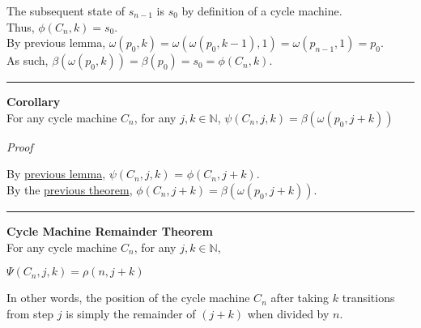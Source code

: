 \documentclass[a4paper,12pt]{article}
\begin{document}
\noindent The subsequent state of $s_{n-1}$ is $s_0$ by definition of a cycle machine.\\

\noindent Thus, $\phi(C_n, k) = s_0$.\\

\noindent By previous lemma, $\omega(p_0, k) = \omega(\omega(p_0, k - 1), 1) = \omega(p_{n-1}, 1) = p_0$.\\

\noindent As such, $\beta(\omega(p_0, k)) = \beta(p_0) = s_0 = \phi(C_n, k)$.\\


\noindent 
\begin{center}
\noindent\rule{8cm}{0.4pt}
\end{center}










\label{corollary:bridged_state_function}
\hypertarget{corollary:bridged_state_function}{}
\begin{tcolorbox}
\textbf{Corollary}\\
For any cycle machine $C_n$, for any $j, k \in \mathbb{N}$, $\psi(C_n, j, k) = \beta(\omega(p_0, j + k))$
\end{tcolorbox}

\noindent
\textit{Proof}

\noindent By \hyperlink{lemma:psi_well_defined}{previous lemma}, $\psi(C_n, j, k)$ = $\phi(C_n, j + k)$.\\

\noindent By the \hyperlink{theorem:bridge_theorem}{previous theorem}, $\phi(C_n, j + k) = \beta(\omega(p_0, j + k))$.

\begin{center}
\noindent\rule{8cm}{0.4pt}
\end{center}








\label{theorem:cycle_machine_remainder_theorem}
\hypertarget{theorem:cycle_machine_remainder_theorem}{}
\begin{tcolorbox}
\textbf{Cycle Machine Remainder Theorem}\\
For any cycle machine $C_n$, for any $j, k \in \mathbb{N}$,

\begin{center}
$\Psi(C_n, j, k) = \rho(n, j + k)$
\end{center}

\noindent In other words, the position of the cycle machine $C_n$ after taking $k$ transitions from step $j$ is simply the remainder of $(j + k)$ when divided by $n$.

\end{tcolorbox}
\end{document}
